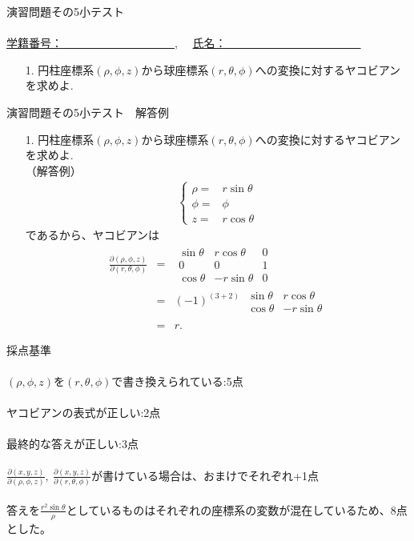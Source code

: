 \documentclass[11pt]{jarticle}
\begin{document}
\begin{center}
{\Large
演習問題その5小テスト}\\
\ \\
\underline{学籍番号：　　　　　　　　　　},　
\underline{氏名：　　　　　　　　　　　　}
\end{center}
\begin{enumerate}
\item[1.]
円柱座標系$(\rho ,\phi ,z)$から球座標系$(r,\theta ,\phi )$への変換に対するヤコビアンを求めよ.
\end{enumerate}


\newpage
\begin{center}
{\Large
演習問題その5小テスト　解答例}\\
\end{center}
\begin{enumerate}
\item[1.]
円柱座標系$(\rho ,\phi ,z)$から球座標系$(r,\theta ,\phi )$への変換に対するヤコビアンを求めよ.
\\
（解答例）\\
\begin{eqnarray*}
\left\{
\begin{array}{cl}
\rho=&r\sin\theta \\
\phi=&\phi \\
z=&r\cos\theta
\end{array}
\right.
\end{eqnarray*}
であるから、ヤコビアンは
\begin{eqnarray*}
\frac{\partial(\rho,\phi,z)}{\partial(r,\theta,\phi)}&=&
\begin{array}{|ccc|}
\sin\theta & r\cos\theta & 0 \\
0 & 0 & 1 \\
\cos\theta & -r\sin\theta & 0
\end{array}
\\[10pt]
&=&
(-1)^{(3+2)} \;
\begin{array}{|cc|}
\sin\theta &r\cos\theta\\
\cos\theta &-r\sin\theta
\end{array}
\\
\\
&=& r.
\end{eqnarray*}

\end{enumerate}

\newpage
採点基準\\
\\
$(\rho ,\phi ,z)$を$(r,\theta ,\phi)$で書き換えられている:5点\\
\\
ヤコビアンの表式が正しい:2点\\
\\
最終的な答えが正しい:3点\\
\\
$\frac{\partial (x,y,z)}{\partial (\rho ,\phi ,z)},~\frac{\partial (x,y,z)}{\partial (r,\theta ,\phi )}$が書けている場合は、おまけでそれぞれ+1点\\
\\
答えを$\frac{r^2\sin\theta}{\rho}$としているものはそれぞれの座標系の変数が混在しているため、8点とした。
\end{document}

